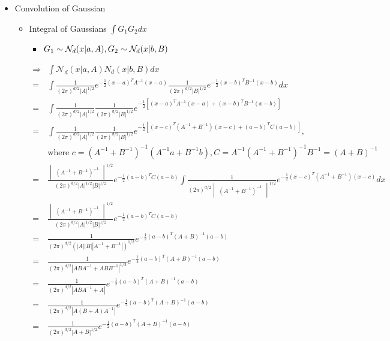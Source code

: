 \subsubsection{}
\begin{itemize}
\item Convolution of Gaussian
	\begin{itemize}
	\item Integral of Gaussians $\int G_1G_2dx$
		\begin{itemize}
		\item $G_1\sim \mathcal N_d(x|a,A), \space G_2 \sim \mathcal N_d(x|b,B)$
		\end{itemize}
		\begin{align*} \displaystyle \Rightarrow & \int \mathcal N_d(x|a,A) N_d(x|b,B)dx \\ = & \int \frac 1 {(2\pi)^{d/2} |A|^{1/2}} e^{-\frac 1 2 (x-a)^TA^{-1}(x-a)} \frac 1 {(2\pi)^{d/2}|B|^{1/2}} e^{-\frac 1 2 (x-b)^TB^{-1}(x-b)} dx \\ = & \int \frac 1 {(2\pi)^{d/2} |A|^{1/2}} \frac 1 {(2\pi)^{d/2}|B|^{1/2}} e^{-\frac 12 [(x-a)^TA^{-1}(x-a)+(x-b)^TB^{-1}(x-b)]} \\ = & \int \frac 1 {(2\pi)^{d/2} |A|^{1/2}} \frac 1 {(2\pi)^{d/2}|B|^{1/2}}  e^{-\frac 12 [(x-c)^T (A^{-1}+B^{-1}) (x-c)+(a-b)^TC(a-b)]},\\ & \text{where } c=(A^{-1}+B^{-1})^{-1}(A^{-1}a+B^{-1}b), C=A^{-1}(A^{-1}+B^{-1})^{-1}B^{-1} = (A+B)^{-1} \\ = & \frac {\begin{vmatrix}(A^{-1}+B^{-1})^{-1}\end{vmatrix}^{1/2}} {(2\pi)^{d/2}|A|^{1/2}|B|^{1/2}} e^{-\frac 12 (a-b)^TC(a-b)} \int \frac 1 {(2\pi)^{d/2}\begin{vmatrix}(A^{-1}+B^{-1})^{-1}\end{vmatrix}^{1/2}} e^{-\frac 12 (x-c)^T(A^{-1}+B^{-1}) (x-c)} dx \\ =& \frac {\begin{vmatrix}(A^{-1}+B^{-1})^{-1}\end{vmatrix}^{1/2}} {(2\pi)^{d/2}|A|^{1/2}|B|^{1/2}} e^{-\frac 12 (a-b)^TC(a-b)} \\ =& \frac 1 {(2\pi)^{d/2} (|A||B||A^{-1}+B^{-1}|)^{1/2}} e^{-\frac 12 (a-b)^T (A+B)^{-1} (a-b)} \\=& \frac 1 {(2\pi)^{d/2} |ABA^{-1}+ABB^{-1}|^{1/2}} e^{-\frac 12 (a-b)^T (A+B)^{-1} (a-b)} \\=& \frac 1 {(2\pi)^{d/2} |ABA^{-1}+A| } e^{-\frac 12 (a-b)^T (A+B)^{-1} (a-b)} \\=& \frac 1 {(2\pi)^{d/2} |A(B+A)A^{-1}| } e^{-\frac 12 (a-b)^T (A+B)^{-1} (a-b)} \\=& \frac 1 {(2\pi)^{d/2} |A+B|^{1/2} } e^{-\frac 12 (a-b)^T (A+B)^{-1} (a-b)} \end{align*}
			

\end{itemize}
\end{itemize}

